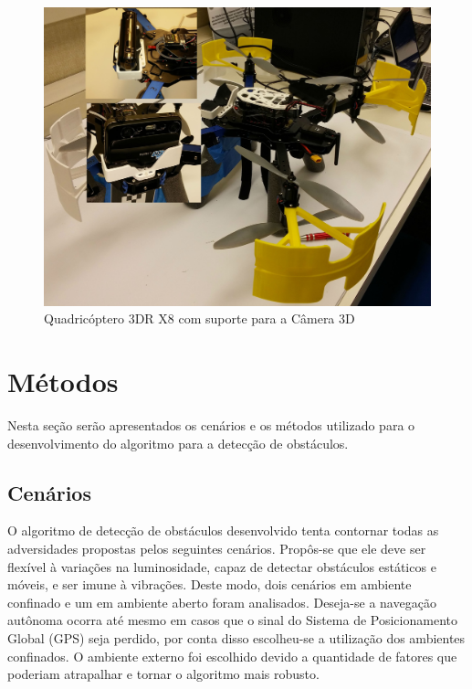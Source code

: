 \begin{figure}[H]
 	\centering
 	\includegraphics[scale=0.10]{./Resources/quad_camera_support.jpg}
 	\caption{Quadricóptero 3DR X8 com suporte para a Câmera 3D}
 	\label{quad_camera_support}
\end{figure}

\section{Métodos}

Nesta seção serão apresentados os cenários e os métodos utilizado para o desenvolvimento do algoritmo para a detecção de obstáculos.

\subsection{Cenários}

O algoritmo de detecção de obstáculos desenvolvido tenta contornar todas as adversidades propostas pelos seguintes cenários. Propôs-se que ele deve ser flexível à variações na luminosidade, capaz de detectar obstáculos estáticos e móveis, e ser imune à vibrações. Deste modo, dois cenários em ambiente confinado e um em ambiente aberto foram analisados. Deseja-se a navegação autônoma ocorra até mesmo em casos que o sinal do Sistema de Posicionamento Global (GPS) seja perdido, por conta disso escolheu-se a utilização dos ambientes confinados. O ambiente externo foi escolhido devido a quantidade de fatores que poderiam atrapalhar e tornar o algoritmo mais robusto.

